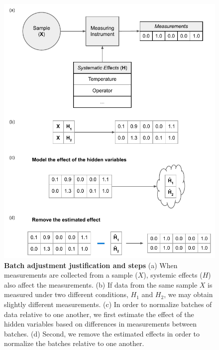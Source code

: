 \documentclass[notitlepage]{article}
\begin{document}
\begin{figure}
	\centering
	\includegraphics[width=\columnwidth]{figures/final/adjuster_workflow.pdf}
	\caption{\textbf{Batch adjustment justification and steps}
	(a) When measurements are collected from a sample ($X$), systemic effects ($H$) also affect the measurements.
	(b) If data from the same sample $X$ is measured under two different conditions, $H_1$ and $H_2$, we may obtain slightly different measurements.
	(c) In order to normalize batches of data relative to one another, we first estimate the effect of the hidden variables based on differences in measurements between batches.
	(d) Second, we remove the estimated effects in order to normalize the batches relative to one another.}
	\label{fig:workflow}
\end{figure}
\end{document}
